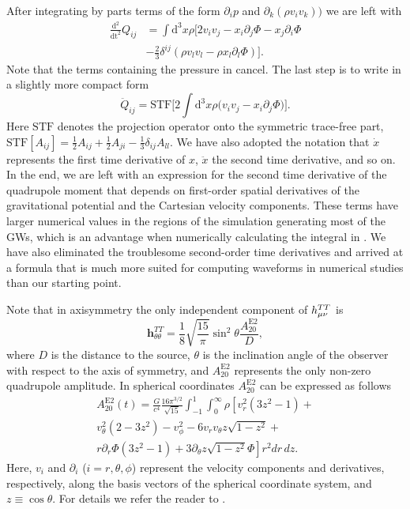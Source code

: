 After integrating by parts terms of the form $\partial_i p$ and $\partial_k (\rho v_i v_k))$
we are left with
\begin{align} \label{eqT:quaddtt3}
\frac{\mathrm{d}^2}{\mathrm{dt}^2} Q_{ij} & = \int \mathrm{d}^3 x \rho \bigg[ 2 v_i v_j  - x_i \partial_j \Phi -  x_j \partial_i \Phi \nonumber \\
&- \frac{2}{3} \delta^{ij} (\rho v_l v_l - \rho x_l \partial_l \Phi)  \bigg]. 
\end{align}
Note that the terms containing the pressure in  cancel. The last step is to write  in a slightly more 
compact form    
\begin{equation} \label{eqT:STFQ}
\ddot{Q}_{ij} =\mathrm{STF} \bigg[2 \int \mathrm{d}^3 x \rho \Big( v_i v_j - x_i \partial_j \Phi \Big) \bigg].
\end{equation}
Here $\mathrm{STF}$ denotes the projection operator
onto the symmetric trace-free part, $\mathrm{STF}[A_{ij}] = \frac{1}{2}A_{ij} + \frac{1}{2}A_{ji} - \frac{1}{3} \delta_{ij} A_{ll} $.
We have also adopted the notation that $\dot{x}$ represents the first time derivative of $x$, $\ddot{x}$ the second time derivative, 
and so on.
In the end, we are left with an expression for the second time derivative of the quadrupole moment that
depends on first-order spatial derivatives of the gravitational potential and the Cartesian velocity components.
These terms have larger numerical values in the regions of the simulation generating most of the GWs, which is an advantage when numerically calculating the integral in . We have also 
eliminated the troublesome second-order time derivatives and arrived at a formula that is much more suited for 
computing waveforms in numerical studies than our starting point.

Note that in axisymmetry the only independent component of $h_{\mu\nu}^{TT}$ is 
\begin{equation}
\mathbf{h}^{TT}_{\theta \theta} = \frac{1}{8}\sqrt{\frac{15}{\pi}} \sin^2{\theta} \frac{A_{20}^\mathrm{E2}}{D},
\end{equation}
where $D$ is the distance to the source, $\theta$ is the inclination angle of the observer with respect to the
axis of symmetry, and $A_{20}^\mathrm{E2}$ represents the only non-zero quadrupole amplitude.
In spherical coordinates $A_{20}^\mathrm{E2}$ can be expressed as follows
\begin{eqnarray} \label{eq:2dquad}
A_{20}^\mathrm{E2} (t) =  \frac{G}{c^4} \frac{16 \pi^{3/2}}{\sqrt{15}} \int_{-1}^{1}\int^{\infty}_0 \rho \left [ v_r^2(3 z^2 - 1)+ \right. \nonumber \\
v_{\theta}^2(2-3 z^2) - v_{\phi}^2 - 6 v_r v_{\theta} z\sqrt{1-z^2} + \nonumber \\
r \partial_r \Phi (3 z^2 - 1) +\left. 3 \partial_{\theta}z\sqrt{1-z^2} \Phi \right ]r^2 dr \, dz.
\end{eqnarray}
Here, $v_i$ and $\partial_i$ ($i = r, \theta, \phi$) represent the velocity components and derivatives, respectively, along
the basis vectors of the spherical coordinate system, and $z \equiv \cos \theta$.
For details we refer the reader to \cite{mueller_97}.

